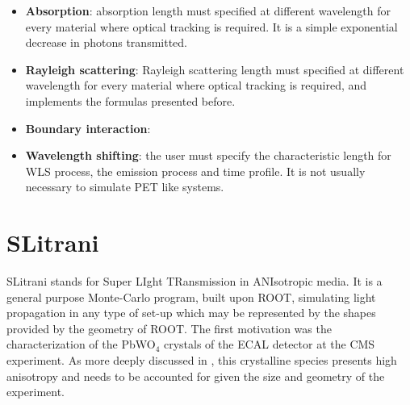 \begin{itemize}
\item \textbf{Absorption}: absorption length must specified at different wavelength for every material where optical tracking is required. It is a simple exponential decrease in photons transmitted.
\item \textbf{Rayleigh scattering}: Rayleigh scattering length must specified at different wavelength for every material where optical tracking is required, and implements the formulas presented before.
\item \textbf{Boundary interaction}:
\item \textbf{Wavelength shifting}: the user must specify the characteristic length for WLS process, the emission process and time profile. It is not usually necessary to simulate PET like systems.
\end{itemize}

\section{SLitrani}
SLitrani stands for Super LIght TRansmission in ANIsotropic media. It is a general purpose Monte-Carlo program, built upon ROOT, simulating light propagation in any type of set-up which may be represented by the shapes provided by the geometry of ROOT. The first motivation was the characterization of the PbWO$_{4}$ crystals of the ECAL detector at the CMS experiment. As more deeply discussed in \cite{Gentit2002}, this crystalline species presents high anisotropy and needs to be accounted for given the size and geometry of the experiment.

